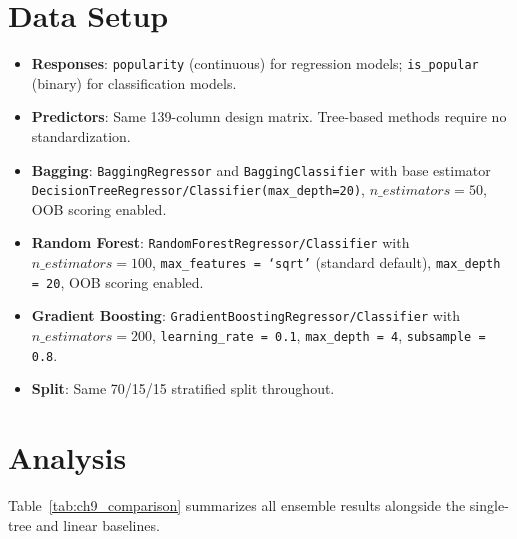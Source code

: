 \documentclass[12pt, oneside]{book}
\begin{document}
\section{Data Setup}
 
\begin{itemize}
    \item \textbf{Responses}: \texttt{popularity} (continuous) for regression models; \texttt{is\_popular} (binary) for classification models.
    \item \textbf{Predictors}: Same 139-column design matrix. Tree-based methods require no standardization.
    \item \textbf{Bagging}: \texttt{BaggingRegressor} and \texttt{BaggingClassifier} with base estimator \texttt{DecisionTreeRegressor/Classifier(max\_depth=20)}, $n\_estimators = 50$, OOB scoring enabled.
    \item \textbf{Random Forest}: \texttt{RandomForestRegressor/Classifier} with $n\_estimators = 100$, \texttt{max\_features = `sqrt'} (standard default), \texttt{max\_depth = 20}, OOB scoring enabled.
    \item \textbf{Gradient Boosting}: \texttt{GradientBoostingRegressor/Classifier} with $n\_estimators = 200$, \texttt{learning\_rate = 0.1}, \texttt{max\_depth = 4}, \texttt{subsample = 0.8}.
    \item \textbf{Split}: Same 70/15/15 stratified split throughout.
\end{itemize}
 
\section{Analysis}
 
Table~\ref{tab:ch9_comparison} summarizes all ensemble results alongside the single-tree and linear baselines.
 
\end{document}
